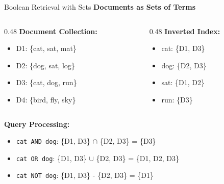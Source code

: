 \documentclass[aspectratio=169]{beamer}
\newif\ifanimated
\newcommand{\cpause}{\ifanimated\pause\fi}
\begin{document}
\begin{frame}{Boolean Retrieval with Sets}
\textbf{Documents as Sets of Terms}

\vspace{1em}

\begin{columns}
\begin{column}{0.48\textwidth}
\textbf{Document Collection:}
\begin{itemize}
    \item D1: \{cat, sat, mat\}
    \item D2: \{dog, sat, log\}
    \item D3: \{cat, dog, run\}
    \item D4: \{bird, fly, sky\}
\end{itemize}
\cpause
\end{column}

\begin{column}{0.48\textwidth}
\textbf{Inverted Index:}
\begin{itemize}
    \item cat: \{D1, D3\}
    \item dog: \{D2, D3\}
    \item sat: \{D1, D2\}
    \item run: \{D3\}
\end{itemize}
\cpause
\end{column}
\end{columns}

\vspace{1em}

\textbf{Query Processing:}
\begin{itemize}
    \item \texttt{cat AND dog}: \{D1, D3\} $\cap$ \{D2, D3\} = \{D3\}
    \item \texttt{cat OR dog}: \{D1, D3\} $\cup$ \{D2, D3\} = \{D1, D2, D3\}
    \item \texttt{cat NOT dog}: \{D1, D3\} - \{D2, D3\} = \{D1\}
\end{itemize}
\end{frame}
\end{document}
